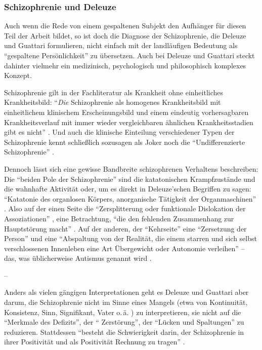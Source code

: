 \documentclass[12pt,
               DIV13,
               paper=a4,
               twoside=false,
               onehalfspacing,
               bibliography=totoc,
               toc=graduated,
               draft,
               ]{scrartcl}
\newcommand{\pc}[2]{\parencite[#1]{#2}}
\newcommand{\vgl}[2]{\parencite[vgl.][#1]{#2}}
\newcommand{\worries}[1]{\ifdraft{\textcolor{blue}{\texttt{(#1)}}}{}}
\begin{document}
\subsubsection{Schizophrenie und Deleuze}

Auch wenn die Rede von einem gespaltenen Subjekt den Aufhänger für
diesen Teil der Arbeit bildet, so ist doch die Diagnose der
Schizophrenie, die Deleuze und Guattari formulieren, nicht einfach mit
der landläufigen Bedeutung als "`gespaltene Persönlichkeit"' zu
übersetzen. Auch bei Deleuze und Guattari steckt dahinter vielmehr ein
medizinisch, psychologisch und philosophisch komplexes Konzept.

Schizophrenie gilt in der Fachliteratur als Krankheit ohne
einheitliches Krankheitsbild: "`\emph{Die} Schizophrenie als homogenes
Krankheitsbild mit einheitlichem klinischem Erscheinungsbild und einem
eindeutig vorhersagbaren Krankheitsverlauf mit immer wieder
vergleichbaren ähnlichen Krankheitsstadien gibt es nicht"'
\pc{799}{psych}. Und auch die klinische Einteilung verschiedener Typen
der Schizophrenie kennt schließlich sozusagen als Joker noch die
"`Undifferenzierte Schizophrenie"' \worries{?}.

Dennoch lässt sich eine gewisse Bandbreite schizophrenen Verhaltens
beschreiben: Die "`beiden Pole der Schizophrenie"' \pc{21}{schizg}
sind die katatonischen Krampfzustände und die wahnhafte Aktivität
oder, um es direkt in Deleuze'schen Begriffen zu sagen: "`Katatonie
des organlosen Körpers, anorganische Tätigkeit der Organmaschinen"'
\pc{21}{schizg}. Also auf der einen Seite die "`Zersplitterung oder
funktionale Dislokation der Assoziationen"' \pc{23}{schizg}, eine
Betrachtung, "`die den fehlenden Zusammenhang zur Hauptstörung macht"'
\pc{23}{schizg}. Auf der anderen, der "`Kehrseite"' eine "`Zersetzung
der Person"' und eine "`Abspaltung von der Realität, die einem
starren und sich selbst verschlossenen Innenleben eine Art Übergewicht
oder Autonomie verleihen"' \pc{23}{schizg} -- das, was üblicherweise
Autismus genannt wird \vgl{801}{psych}.

--

Anders als vielen gängigen Interpretationen geht es Deleuze und
Guattari aber darum, die Schizophrenie nicht im Sinne eines Mangels
(etwa von Kontinuität, Konsistenz, Sinn, Signifikant, Vater o.\,ä.
\vgl{xx}{ao}) zu interpretieren, sie nicht auf die "`Merkmale des
Defizits"', der "` Zerstörung"', der "`Lücken und Spaltungen"'
\pc{24}{schizg} zu reduzieren. Stattdessen "`besteht die Schwierigkeit
darin, der Schizophrenie in ihrer Positivität und als Positivität
Rechnung zu tragen"' \pc{24}{schizg}.
\end{document}
